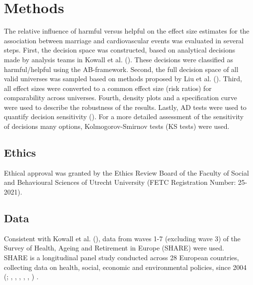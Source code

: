 \documentclass[
  man,
  floatsintext,
  longtable,
  nolmodern,
  notxfonts,
  notimes,
  colorlinks=true,linkcolor=blue,citecolor=blue,urlcolor=blue]{apa7}
\begin{document}
\section{Methods}\label{methods}

The relative influence of harmful versus helpful on the effect size
estimates for the association between marriage and cardiovascular events
was evaluated in several steps. First, the decision space was
constructed, based on analytical decisions made by analysis teams in
Kowall et al. (). These
decisions were classified as harmful/helpful using the AB-framework.
Second, the full decision space of all valid universes was sampled based
on methods proposed by Liu et al.
(). Third, all effect sizes
were converted to a common effect size (risk ratios) for comparability
across universes. Fourth, density plots and a specification curve were
used to describe the robustness of the results. Lastly, AD tests were
used to quantify decision sensitivity
(). For a
more detailed assessment of the sensitivity of decisions many options,
Kolmogorov-Smirnov tests (KS tests) were used.

\subsection{Ethics}\label{ethics}

Ethical approval was granted by the Ethics Review Board of the Faculty
of Social and Behavioural Sciences of Utrecht University (FETC
Registration Number: 25-2021).

\subsection{Data}\label{data}

Consistent with Kowall et al.
(), data from waves 1-7
(excluding wave 3) of the Survey of Health, Ageing and Retirement in
Europe (SHARE) were used. SHARE is a longitudinal panel study conducted
across 28 European countries, collecting data on health, social,
economic and environmental policies, since 2004
(;
,
,
,
,
,
) .
\end{document}
